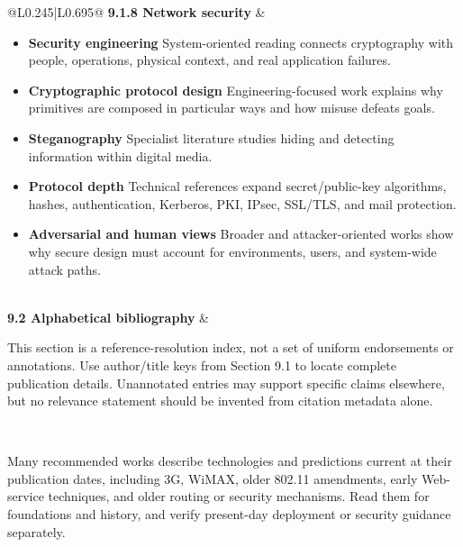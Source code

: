 \documentclass[10pt,letterpaper]{article}
\begin{document}
\begin{longtable}{@{}L{0.245\textwidth}|L{0.695\textwidth}@{}}
\textbf{9.1.8 Network security} & \begin{minipage}[t]{\linewidth}\raggedright \begin{itemize}\item \textbf{Security engineering} System-oriented reading connects cryptography with people, operations, physical context, and real application failures.\item \textbf{Cryptographic protocol design} Engineering-focused work explains why primitives are composed in particular ways and how misuse defeats goals.\item \textbf{Steganography} Specialist literature studies hiding and detecting information within digital media.\item \textbf{Protocol depth} Technical references expand secret/public-key algorithms, hashes, authentication, Kerberos, PKI, IPsec, SSL/TLS, and mail protection.\item \textbf{Adversarial and human views} Broader and attacker-oriented works show why secure design must account for environments, users, and system-wide attack paths.\end{itemize}\end{minipage} \\ \hline
{}\textbf{9.2 Alphabetical bibliography} & \begin{minipage}[t]{\linewidth}\raggedright This section is a reference-resolution index, not a set of uniform endorsements or annotations. Use author/title keys from Section 9.1 to locate complete publication details. Unannotated entries may support specific claims elsewhere, but no relevance statement should be invented from citation metadata alone.\end{minipage} \\ \hline
\end{longtable}

\begin{legacybox}Many recommended works describe technologies and predictions current at their publication dates, including 3G, WiMAX, older 802.11 amendments, early Web-service techniques, and older routing or security mechanisms. Read them for foundations and history, and verify present-day deployment or security guidance separately.\end{legacybox}

\end{document}
